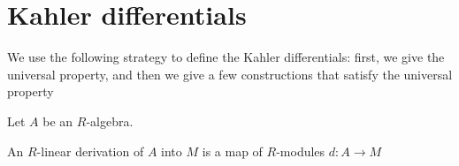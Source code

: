 %
%			
%
%

\section{Kahler differentials}


\newcommand{\Der}{\operatorname{Der}}

We use the following strategy to define
the Kahler differentials:
first, we give the universal property, 
and then we give a few constructions that
satisfy the universal property

Let \(A\) be an \(R\)-algebra. 
\begin{defn}
	An \(R\)-linear derivation of \(A\) into \(M\) 
	is a map of \(R\)-modules
	\(d \colon A \to M\) 
\end{defn}

